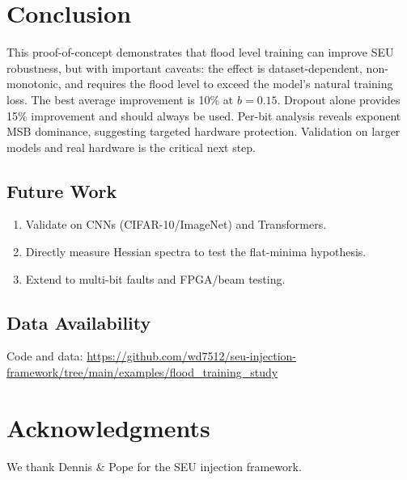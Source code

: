 \documentclass{article}
\begin{document}
\section{Conclusion}

This proof-of-concept demonstrates that flood level training can improve SEU robustness, but with important caveats: the effect is dataset-dependent, non-monotonic, and requires the flood level to exceed the model's natural training loss. The best average improvement is 10\% at $b{=}0.15$. Dropout alone provides 15\% improvement and should always be used. Per-bit analysis reveals exponent MSB dominance, suggesting targeted hardware protection. Validation on larger models and real hardware is the critical next step.

\subsection{Future Work}

\begin{enumerate}
	\item Validate on CNNs (CIFAR-10/ImageNet) and Transformers.
	\item Directly measure Hessian spectra to test the flat-minima hypothesis.
	\item Extend to multi-bit faults and FPGA/beam testing.
\end{enumerate}

\subsection{Data Availability}

Code and data: \small\url{https://github.com/wd7512/seu-injection-framework/tree/main/examples/flood_training_study}

\section*{Acknowledgments}

We thank Dennis \& Pope \cite{dennis2025framework} for the SEU injection framework.



\end{document}
